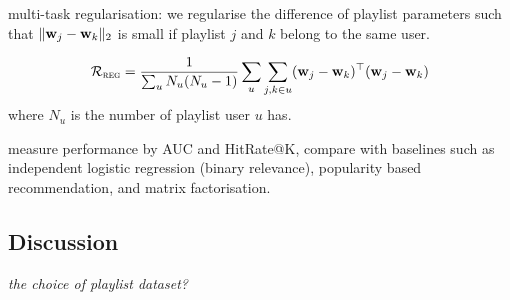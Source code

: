 multi-task regularisation: we regularise the difference of playlist parameters 
such that $\|\mathbf{w}_j - \mathbf{w}_k\|_2$ is small if playlist $j$ and $k$ belong to the same user.

\begin{equation*}
\mathcal{R}_\textsc{reg} = \frac{1}{\sum_u N_u (N_u - 1)} \sum_u \sum_{j, k \in u} (\mathbf{w}_j - \mathbf{w}_k)^\top (\mathbf{w}_j - \mathbf{w}_k)
\end{equation*}
where $N_u$ is the number of playlist user $u$ has.

\begin{table}[!h]
\centering
\caption{Empirical results}
\end{table}



\TODO
measure performance by AUC and HitRate@K,
compare with baselines such as independent logistic regression (\ie binary relevance), popularity based recommendation,
and matrix factorisation.



\subsection{Discussion}

{\it the choice of playlist dataset?}
